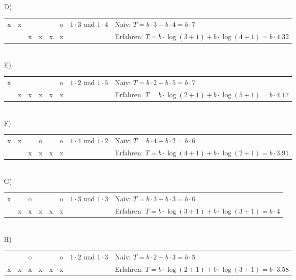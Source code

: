 \documentclass[a4paper,10pt]{article}
\begin{document}
D)\\
\begin{tabular}{|c|c|c|c|c|c|l|l}
\cline{1-6} x & x &   &   &   & o & $1\cdot 3$ und $1\cdot 4$ & Naiv: $T = b\cdot 3+b\cdot 4 = b\cdot 7$ \\
\cline{1-6}   &   & x & x & x & x &   & Erfahren: $T = b\cdot \log(3+1)+b\cdot \log(4+1) = b\cdot 4.32$ \\
\cline{1-6}
\end{tabular} \\

E)\\
\begin{tabular}{|c|c|c|c|c|c|l|l}
\cline{1-6} x &   &   &   &   & o & $1\cdot 2$ und $1\cdot 5$ & Naiv: $T = b\cdot 2+b\cdot 5 = b\cdot 7$ \\
\cline{1-6}   & x & x & x & x & x &   & Erfahren: $T = b\cdot \log(2+1)+b\cdot \log(5+1) = b\cdot 4.17$ \\
\cline{1-6}
\end{tabular} \\

F)\\
\begin{tabular}{|c|c|c|c|c|c|l|l}
\cline{1-6} x & x &   & o &   & o & $1\cdot 4$ und $1\cdot 2$ & Naiv: $T = b\cdot 4+b\cdot 2 = b\cdot 6$ \\
\cline{1-6}   &   & x & x & x & x &   & Erfahren: $T = b\cdot \log(4+1)+b\cdot \log(2+1) = b\cdot 3.91$ \\
\cline{1-6}
\end{tabular} \\

G)\\
\begin{tabular}{|c|c|c|c|c|c|l|l}
\cline{1-6} x &   & o &   &   & o & $1\cdot 3$ und $1\cdot 3$ & Naiv: $T = b\cdot 3+b\cdot 3 = b\cdot 6$ \\
\cline{1-6}   & x & x & x & x & x &   & Erfahren: $T = b\cdot \log(3+1)+b\cdot \log(3+1) = b\cdot 4$ \\
\cline{1-6}
\end{tabular} \\

H)\\
\begin{tabular}{|c|c|c|c|c|c|l|l}
\cline{1-6}   &   & o &   &   & o & $1\cdot 2$ und $1\cdot 3$ & Naiv: $T = b\cdot 2+b\cdot 3 = b\cdot 5$ \\
\cline{1-6} x & x & x & x & x & x &   & Erfahren: $T = b\cdot \log(2+1)+b\cdot \log(3+1) = b\cdot 3.58$ \\
\cline{1-6}
\end{tabular} \\
\end{document}
